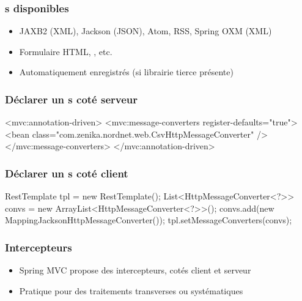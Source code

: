 \begin{frame}
 \frametitle{s disponibles}
 
 \begin{itemize}
  \item JAXB2 (XML), Jackson (JSON), Atom, RSS, Spring OXM (XML)
  \item Formulaire HTML, , etc.
  \item Automatiquement enregistrés (si librairie tierce présente)
 \end{itemize}

\end{frame} 

\begin{frame}[fragile]
 \frametitle{Déclarer un s coté serveur} 
 
 \begin{xmlcode}
<mvc:annotation-driven>
  <mvc:message-converters register-defaults="true">
    <bean class="com.zenika.nordnet.web.CsvHttpMessageConverter" />
  </mvc:message-converters>
</mvc:annotation-driven>
 \end{xmlcode}

\end{frame} 

\begin{frame}[fragile]
 \frametitle{Déclarer un s coté client} 
 
 \begin{javacode}
RestTemplate tpl = new RestTemplate();
List<HttpMessageConverter<?>> convs = 
  new ArrayList<HttpMessageConverter<?>>();
convs.add(new MappingJacksonHttpMessageConverter());
tpl.setMessageConverters(convs);
 \end{javacode}

\end{frame} 

\begin{frame}
 \frametitle{Intercepteurs} 
 
 \begin{itemize}
  \item Spring MVC propose des intercepteurs, cotés client et serveur
  \item Pratique pour des traitements transverses ou systématiques
 \end{itemize}

\end{frame} 


